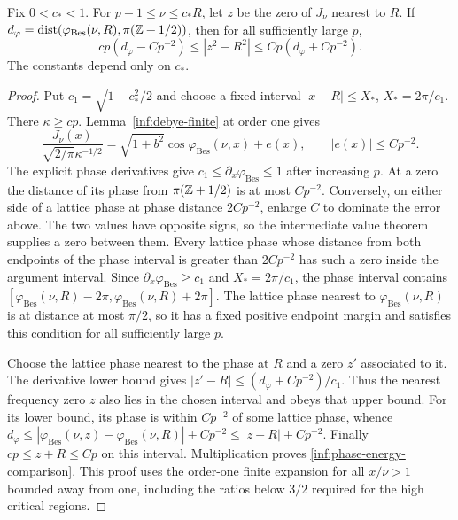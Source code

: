 \begin{lemma}
\label{inf:phase-eigenvalue-two-sided}
Fix $0<c_*<1$. For $p-1\le\nu\le c_*R$, let $z$ be the zero of
$J_\nu$ nearest to $R$. If
$d_{\varphi}=\operatorname{dist}(\varphi_{\mathrm{Bes}}(\nu,R),\pi(\mathbb{Z}+1/2))$,
then for all sufficiently large $p$,
\begin{equation}\label{inf:phase-energy-comparison}
 c p(d_{\varphi}-Cp^{-2})
 \le |z^2-R^2|\le C p(d_{\varphi}+Cp^{-2}).
\end{equation}
The constants depend only on $c_*$.
\end{lemma}
\begin{proof}
Put $c_1=\sqrt{1-c_*^2}/2$ and choose a fixed interval
$|x-R|\le X_*$, $X_*=2\pi/c_1$. There $\kappa\ge cp$.
Lemma~\ref{inf:debye-finite} at order one gives
\[
 \frac{J_\nu(x)}{\sqrt{2/\pi}\kappa^{-1/2}}
 =\sqrt{1+b^2}\cos\varphi_{\mathrm{Bes}}(\nu,x)+e(x),
 \qquad |e(x)|\le C p^{-2}.
\]
The explicit phase derivatives give
$c_1\le\partial_x\varphi_{\mathrm{Bes}}\le1$ after increasing
$p$. At a zero the distance of its phase from $\pi(\mathbb{Z}+1/2)$ is
at most $Cp^{-2}$. Conversely, on either side of a lattice phase at
phase distance $2Cp^{-2}$, enlarge $C$ to dominate the error above.
The two values have opposite signs, so the intermediate value
theorem supplies a zero between them. Every lattice phase whose
distance from both endpoints of the phase interval is greater
than $2Cp^{-2}$ has such a zero inside the argument interval.
Since $\partial_x\varphi_{\mathrm{Bes}}\ge c_1$ and
$X_*=2\pi/c_1$, the phase interval contains
$[\varphi_{\mathrm{Bes}}(\nu,R)-2\pi,
\varphi_{\mathrm{Bes}}(\nu,R)+2\pi]$.
The lattice phase nearest to $\varphi_{\mathrm{Bes}}(\nu,R)$ is
at distance at most $\pi/2$, so it has a fixed positive endpoint
margin and satisfies this condition for all sufficiently large $p$.

Choose the lattice phase nearest to the phase at $R$ and a zero
$z'$ associated to it. The derivative lower bound gives
$|z'-R|\le(d_{\varphi}+Cp^{-2})/c_1$. Thus the nearest frequency
zero $z$ also lies in the chosen interval and obeys that upper bound.
For its lower bound, its phase is within $Cp^{-2}$ of some lattice
phase, whence
$d_{\varphi}\le|\varphi_{\mathrm{Bes}}(\nu,z)
-\varphi_{\mathrm{Bes}}(\nu,R)|+Cp^{-2}\le|z-R|+Cp^{-2}$.
Finally $cp\le z+R\le Cp$ on this interval. Multiplication proves
\eqref{inf:phase-energy-comparison}. This proof uses the order-one
finite expansion for all $x/\nu>1$ bounded away from one, including
the ratios below $3/2$ required for the high critical regions.
\end{proof}

